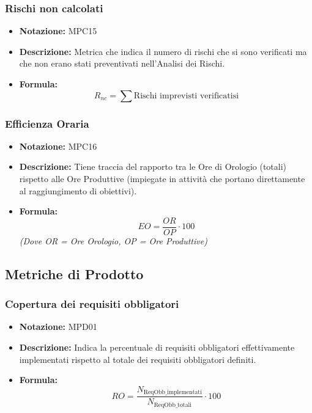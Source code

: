 \documentclass[a4paper,12pt]{article}
\begin{document}
        \subsubsection{Rischi non calcolati}
            \begin{itemize}
                \item \textbf{Notazione:} MPC15
                \item \textbf{Descrizione:} Metrica che indica il numero di rischi che si sono verificati ma che non erano stati preventivati nell'Analisi dei Rischi.
                \item \textbf{Formula:} 
                \[ R_{nc} = \sum \text{Rischi imprevisti verificatisi} \]
            \end{itemize}

        \subsubsection{Efficienza Oraria}
            \begin{itemize}
                \item \textbf{Notazione:} MPC16
                \item \textbf{Descrizione:} Tiene traccia del rapporto tra le Ore di Orologio (totali) rispetto alle Ore Produttive (impiegate in attività che portano direttamente al raggiungimento di obiettivi).
                \item \textbf{Formula:} 
                \[ EO = \frac{OR}{OP} \cdot 100 \]
                \textit{\small{(Dove OR = Ore Orologio, OP = Ore Produttive)}}
            \end{itemize}

    \subsection{Metriche di Prodotto}
        \label{sec:metprod}
        \subsubsection{Copertura dei requisiti obbligatori}
            \begin{itemize}
                \item \textbf{Notazione:} MPD01
                \item \textbf{Descrizione:} Indica la percentuale di requisiti obbligatori effettivamente implementati rispetto al totale dei requisiti obbligatori definiti.
                \item \textbf{Formula:} 
                \[ RO = \frac{N_\text{ReqObb\_implementati}}{N_\text{ReqObb\_totali}} \cdot 100 \]
            \end{itemize}
\end{document}

